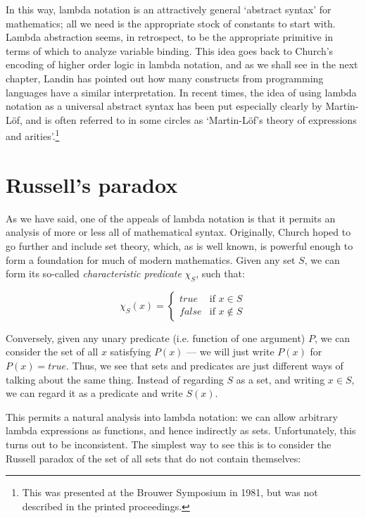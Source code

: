 In this way, lambda notation is an attractively general `abstract syntax' for
mathematics; all we need is the appropriate stock of constants to start with.
Lambda abstraction seems, in retrospect, to be the appropriate primitive in
terms of which to analyze variable binding. This idea goes back to Church's
encoding of higher order logic in lambda notation, and as we shall see in the
next chapter, Landin has pointed out how many constructs from programming
languages have a similar interpretation. In recent times, the idea of using
lambda notation as a universal abstract syntax has been put especially clearly
by Martin-L\"of, and is often referred to in some circles as `Martin-L\"of's
theory of expressions and arities'.\footnote{This was presented at the Brouwer
Symposium in 1981, but was not described in the printed proceedings.}

\section{Russell's paradox}

As we have said, one of the appeals of lambda notation is that it permits an
analysis of more or less all of mathematical syntax. Originally, Church hoped
to go further and include set theory, which, as is well known, is powerful
enough to form a foundation for much of modern mathematics. Given any set $S$,
we can form its so-called {\em characteristic predicate} $\chi_S$, such that:

$$ \chi_S(x) = \left\{ \begin{array}{ll}
                        true & \mbox{if $x \in S$} \\
                        false & \mbox{if $x \not\in S$}
                 \end{array} \right. $$

Conversely, given any unary predicate (i.e. function of one argument) $P$, we
can consider the set of all $x$ satisfying $P(x)$ --- we will just write $P(x)$
for $P(x) = true$. Thus, we see that sets and predicates are just different
ways of talking about the same thing. Instead of regarding $S$ as a set, and
writing $x \in S$, we can regard it as a predicate and write $S(x)$.

This permits a natural analysis into lambda notation: we can allow arbitrary
lambda expressions as functions, and hence indirectly as sets. Unfortunately,
this turns out to be inconsistent. The simplest way to see this is to consider
the Russell paradox of the set of all sets that do not contain themselves:


